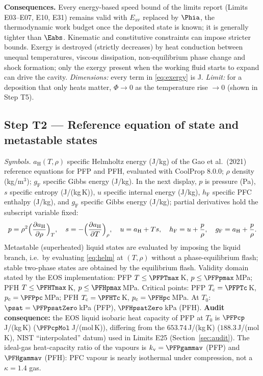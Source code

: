 \textbf{Consequences.} Every energy-based speed bound of the limits report (Limits E03--E07, E10, E31)
remains valid with $E_{\mathrm{av}}$ replaced by $\Phia$, the thermodynamic work budget once
the deposited state is known; it is generally tighter than $\Eabs$. Kinematic and constitutive
constraints can impose stricter bounds. Exergy is destroyed (strictly decreases)
by heat conduction between unequal temperatures, viscous dissipation, non-equilibrium phase change and
shock formation; only the exergy present when the working fluid starts to expand can drive the cavity.
\emph{Dimensions:} every term in \eqref{eq:exergy} is J. \emph{Limit:} for a deposition that only
heats matter, $\Phi\to0$ as the temperature rise $\to0$ (shown in Step T5).

\subsection{Step T2 --- Reference equation of state and metastable states}
\emph{Symbols.} $a_{\mathrm H}(T,\rho)$ specific Helmholtz energy (J/kg) of the Gao et al.\ (2021) reference
equations for PFP and PFH, evaluated with CoolProp 8.0.0; $\rho$ density (kg/m$^3$); $g_{\mathrm F}$ specific Gibbs
energy (J/kg). In the next display, $p$ is pressure (Pa), $s$ specific entropy (J/(kg\,K)),
$u$ specific internal energy (J/kg), $h_{\mathrm F}$ specific PFC enthalpy (J/kg), and
$g_{\mathrm F}$ specific Gibbs energy (J/kg); partial derivatives hold the subscript variable fixed:
\begin{equation}
p=\rho^2\Bigl(\frac{\partial a_{\mathrm H}}{\partial\rho}\Bigr)_T,\quad
s=-\Bigl(\frac{\partial a_{\mathrm H}}{\partial T}\Bigr)_\rho,\quad u=a_{\mathrm H}+Ts,\quad
h_{\mathrm F}=u+\frac p\rho,\quad g_{\mathrm F}=a_{\mathrm H}+\frac p\rho .\label{eq:helm}
\end{equation}
Metastable (superheated) liquid states are evaluated by imposing the liquid branch, i.e.\ by evaluating
\eqref{eq:helm} at $(T,\rho)$ without a phase-equilibrium flash; stable two-phase states are obtained by
the equilibrium flash. Validity domain stated by the EOS implementation: PFP $T\le\PFPTmax$\,K,
$p\le\PFPpmax$\,MPa; PFH $T\le\PFHTmax$\,K, $p\le\PFHpmax$\,MPa. Critical points: PFP
$T_{\mathrm c}=\PFPTc$\,K, $p_{\mathrm c}=\PFPpc$\,MPa; PFH $T_{\mathrm c}=\PFHTc$\,K,
$p_{\mathrm c}=\PFHpc$\,MPa. At $T_0$: $\psat=\PFPpsatZero$\,kPa (PFP), $\PFHpsatZero$\,kPa (PFH).
\textbf{Audit consequence:} the EOS liquid isobaric heat capacity of PFP at $T_0$ is
$\PFPcp$\,J/(kg\,K) ($\PFPcpMol$\,J/(mol\,K)), differing from the $653.74$\,J/(kg\,K) ($188.3$\,J/(mol\,K), NIST
``interpolated'' datum) used in Limits E25 (Section~\ref{sec:audit}). The ideal-gas heat-capacity ratio of
the vapours is $k_{\mathrm v}=\PFPgammav$ (PFP) and $\PFHgammav$ (PFH): PFC vapour is nearly isothermal under
compression, not a $\kappa=1.4$ gas.

